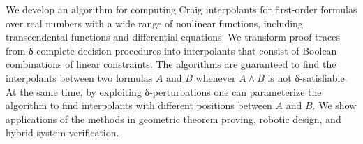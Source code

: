 We develop an algorithm for computing Craig interpolants for first-order formulas over real numbers with a wide range of nonlinear functions, including transcendental functions and differential equations.
We transform proof traces from δ-complete decision procedures into interpolants that consist of Boolean combinations of linear constraints.
The algorithms are guaranteed to find the interpolants between two formulas $A$ and $B$ whenever $A ∧ B$ is not δ-satisfiable.
At the same time, by exploiting δ-perturbations one can parameterize the algorithm to find interpolants with different positions between $A$ and $B$.
We show applications of the methods in geometric theorem proving, robotic design, and hybrid system verification.  
